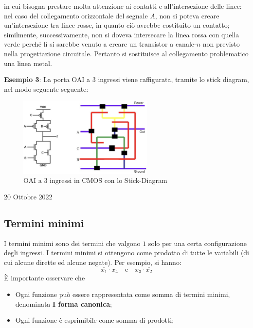 \documentclass[a4paper]{extarticle}
\begin{document}
\noindent
in cui bisogna prestare molta attenzione ai contatti e all'intersezione delle linee: nel caso del collegamento orizzontale del segnale $A$, non si poteva creare un'intersezione tra linee rosse, in quanto ciò avrebbe costituito un contatto; similmente, successivamente, non si doveva intersecare la linea rossa con quella verde perché lì si sarebbe venuto a creare un transistor a canale-$n$ non previsto nella progettazione circuitale. Pertanto si sostituisce al collegamento problematico una linea metal.

\vspace{1em}
\noindent
\textbf{Esempio 3}: La porta OAI a $3$ ingressi viene raffigurata, tramite lo stick diagram, nel modo seguente seguente:

\begin{figure}[H]
    \centering
    \includegraphics[width=0.6\textwidth]{stick-diagram-esempio-3.png}
    \caption{OAI a $3$ ingressi in CMOS con lo Stick-Diagram}
    \label{fig:oai_3_ingressi_cmos_stick_diagram}
\end{figure}

\newpage
\begin{center} 
    20 Ottobre 2022
\end{center}

\vspace{1em}
\noindent
\subsection{Termini minimi}
I termini minimi sono dei termini che valgono $1$ solo per una certa configurazione degli ingressi. I termini minimi si ottengono come prodotto di tutte le variabili (di cui alcune dirette ed alcune negate). Per esempio, si hanno:
\[\overline{x_1} \cdot x_4 \hspace{1em} \text{e} \hspace{1em} x_3 \cdot \overline{x_2}\]
È importante osservare che
\begin{itemize}
    \item Ogni funzione può essere rappresentata come somma di termini minimi, denominata \textbf{I forma canonica};
    \item Ogni funzione è esprimibile come somma di prodotti;
\end{itemize}
\end{document}
